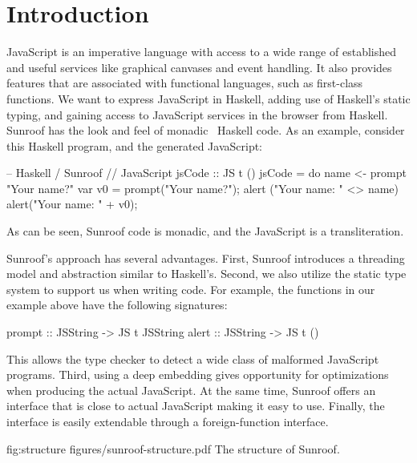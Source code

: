  
\section{Introduction}

JavaScript is an imperative language with access to a wide range
of established and useful services like graphical canvases and event
handling. It also provides features that are associated with 
functional languages, such as first-class functions. 
We want to express JavaScript in Haskell, adding use
of Haskell's static typing, and gaining access to JavaScript services
in the browser from Haskell.
%
Sunroof has the look and feel of monadic~\cite{Moggi:91:ComputationMonads} Haskell code. As an example,
consider this Haskell program, and the generated JavaScript:

\noindent
\begin{Code}
-- Haskell / Sunroof                 // JavaScript
jsCode :: JS t ()
jsCode = do
   name <- prompt "Your name?"       var v0 = prompt("Your name?"); 
   alert ("Your name: " <> name)     alert("Your name: " + v0);
\end{Code}%
As can be seen, Sunroof code is monadic, and the JavaScript is a transliteration.

Sunroof's approach has several advantages. 
First,
Sunroof introduces a threading model and abstraction similar
to Haskell's. 
Second, we also utilize the static type system to support us when 
writing code. For example, the functions
in our example above have the following signatures:
\begin{Code}
prompt :: JSString -> JS t JSString
alert  :: JSString -> JS t ()
\end{Code}
This allows the type checker to detect a wide class
of malformed JavaScript programs.
Third, using a deep embedding gives opportunity 
for optimizations when producing the actual JavaScript.
At the same time, Sunroof offers an interface that is 
close to actual JavaScript making it easy to use.
Finally, the interface is easily extendable through
a foreign-function interface.

\Figure%
{fig:structure}%
{figures/sunroof-structure.pdf}%
{The structure of Sunroof.}

